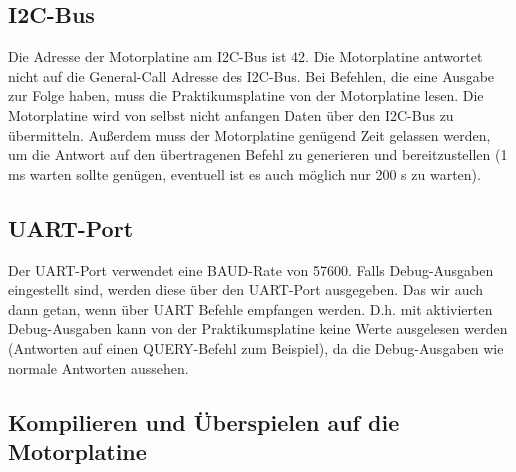 \documentclass[a4paper]{article}
\begin{document}
	\subsection{I2C-Bus}
	
	Die Adresse der Motorplatine am I2C-Bus ist 42. Die Motorplatine
	antwortet nicht auf die General-Call Adresse des I2C-Bus. Bei
	Befehlen, die eine Ausgabe zur Folge haben, muss die Praktikumsplatine
	von der Motorplatine lesen. Die Motorplatine wird von selbst nicht
	anfangen Daten über den I2C-Bus zu übermitteln. Außerdem muss der
	Motorplatine genügend Zeit gelassen werden, um die Antwort auf
	den übertragenen Befehl zu generieren und bereitzustellen (1 ms warten
	sollte genügen, eventuell ist es auch möglich nur 200 \textmu{}s zu
	warten).
	
	\subsection{UART-Port}
	
	Der UART-Port verwendet eine BAUD-Rate von 57600. Falls Debug-Ausgaben
	eingestellt sind, werden diese über den UART-Port ausgegeben. Das
	wir auch dann getan, wenn über UART Befehle empfangen werden. D.h.
	mit aktivierten Debug-Ausgaben kann von der Praktikumsplatine keine
	Werte ausgelesen werden (Antworten auf einen QUERY-Befehl zum Beispiel),
	da die Debug-Ausgaben wie normale Antworten aussehen.
	
	\subsection{Kompilieren und Überspielen auf die Motorplatine}
	
\end{document}
